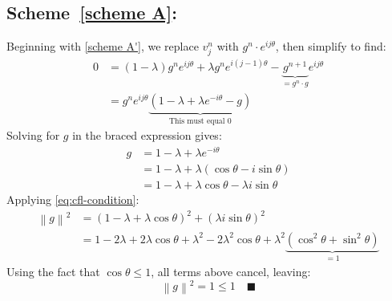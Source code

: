\documentclass{math_hw}
\renewcommand\qedsymbol{\blacksquare}
\theoremstyle{definition}
\begin{document}
    \subsection*{Scheme~\ref{scheme A}:}
    Beginning with \cref{scheme A'}, we replace $v_j^n$ with $g^n \cdot e^{ij\theta}$, then simplify to find:
    \begin{equation*}
        \label{2A'}
        \begin{split}
            0&= (1-\lambda)g^n e^{ij\theta} +\lambda g^n e^{i(j-1)\theta} -\underbrace{g^{n+1}}_{=g^n\cdot g} e^{ij\theta} \\
            &=g^n e^{ij\theta} \underbrace{\left(1-\lambda +\lambda e^{-i\theta}-g\right)}_{\text{This must equal 0}}
        \end{split}
    \end{equation*}
    Solving for $g$ in the braced expression gives:
    \begin{equation*}
        \label{2A g}
        \begin{split}
            g &= 1-\lambda +\lambda e^{-i\theta}\\
            &= 1-\lambda+\lambda(\cos\theta -i\sin\theta)\\
            &=1-\lambda +\lambda\cos \theta -\lambda i\sin \theta
        \end{split}
    \end{equation*}
    Applying \cref{eq:cfl-condition}:
    \begin{equation*}
        \begin{split}
            \left\| g \right\|^2 &= \left( 1-\lambda +\lambda\cos \theta \right)^2 + \left( \lambda i\sin \theta \right)^2\\
            &= 1-2\lambda +2\lambda \cos \theta +\lambda^2 -2\lambda ^2 \cos \theta +\lambda ^2 \underbrace{\left( \cos^2 \theta +\sin^2\theta \right)}_{=1}
        \end{split}
    \end{equation*}
    Using the fact that $\cos \theta \leq 1$, all terms above cancel, leaving:
    \begin{equation*}
        \left\| g \right\|^2 =1 \leq 1 \quad \qedsymbol
    \end{equation*}
\end{document}
